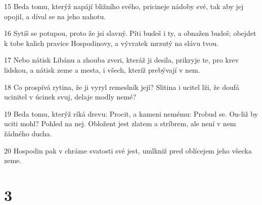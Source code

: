 \par 15 Beda tomu, kterýž napájí bližního svého, pricineje nádoby své, tak aby jej opojil, a díval se na jeho nahotu.
\par 16 Sytíš se potupou, proto že jsi slavný. Píti budeš i ty, a obnažen budeš; obejdet k tobe kalich pravice Hospodinovy, a vývratek mrzutý na slávu tvou.
\par 17 Nebo nátisk Libánu a zhouba zveri, kteráž ji desila, prikryje te, pro krev lidskou, a nátisk zeme a mesta, i všech, kteríž prebývají v nem.
\par 18 Co prospívá rytina, že ji vyryl remeslník její? Slitina i ucitel lži, že doufá ucinitel v úcinek svuj, delaje modly nemé?
\par 19 Beda tomu, kterýž ríká drevu: Procit, a kameni nemému: Probud se. On-liž by uciti mohl? Pohled na nej. Obložent jest zlatem a stríbrem, ale není v nem žádného ducha.
\par 20 Hospodin pak v chráme svatosti své jest, umlkniž pred oblícejem jeho všecka zeme.

\chapter{3}

